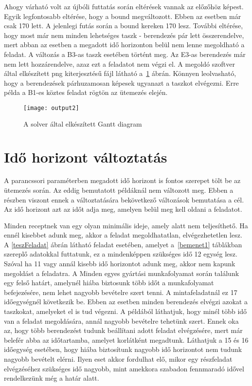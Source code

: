 Ahogy várható volt az újbóli futtatás során eltérések vannak az előzőhöz képest. Egyik legfontosabb eltérése, hogy a bound megváltozott. Ebben az esetben már csak 170 lett. A jelenlegi futás során a bound kereken 170 lesz. További eltérése, hogy most már nem minden lehetséges taszk - berendezés pár lett összerendelve, mert abban az esetben a megadott idő horizonton belül nem lenne megoldható a feladat. A változás a B3-as taszk esetében történt meg. Az E3-as berendezés már nem lett hozzárendelve, azaz ezt a feladatot nem végzi el. A megoldó szoftver által elkészített png kiterjesztésű fájl látható a~\ref{output2} ábrán. Könnyen leolvasható, hogy a berendezések párhuzamosan képesek ugyanazt a taszkot elvégezni. Erre példa a B1-es köztes feladat rögtön az ütemezés elején. 

\begin{figure}[H]
\begin{center}
\texttt{[image: output2]}
\caption{A solver által elkészített Gantt diagram}
\label{output2}
\end{center}
\end{figure}

\section{Idő horizont változtatás}
A parancssori paraméterben megadott idő horizont is fontos szerepet tölt be az ütemezés során. Az eddig bemutatott példáknál nem változott meg. Ebben a részben viszont ennek a változtatására bekövetkező változások bemutatása a cél. Az idő horizont azt az időt adja meg, amelyen belül meg kell oldani a feladatot.

Minden receptnek van egy olyan minimális ideje, amely alatt nem teljesíthető. Ha ennél kisebbet adunk meg, akkor a feladat megoldhatatlan, elvégezhetetlen lesz. A \ref{teszFeladat} ábrán látható feladat esetében, amelyet a~\ref{bemenet1} táblákban szereplő adatokkal futtatunk, ez a mindenképpen szükséges idő 12 egység lesz. Szóval ha 11 vagy annál kisebb idő horizontot adunk meg, akkor nem kapunk megoldást a feladatra. A Minden egyes gyártási munkafolyamat során találunk egy felső határt, amelynél hiába biztosunk több időt a munkafolyamat befejezésére, nem lehet nagyobb bevételre szert tenni. A mintafeladatnál ez 17 időegységnél következik be. Ebben az esetben minden berendezés elvégzi azokat a taszkokat, amelyeket el is tud végezni. A példából láthatjuk, hogy minél több idő van a feladat megoldására, annál nagyobb bevételre tehetünk szert. Ennek oka az, hogy több berendezést tudunk beállítani adott feladat elvégzésére, mert már belefér abba az időtartamba, amelyet korlátként megadtunk. Láthatjuk a 15 és 16 időegység esetében, hogy hiába biztosítunk nagyobb idő horizontot nem tudunk nagyobb bevételt elérni. Ilyen eset akkor fordulhat elő, mikor egy részfeladat elvégzéséhez szükséges idő nagyobb, mint amekkora szabadon fennmaradó idővel rendelkezünk még a határ alatt.  

